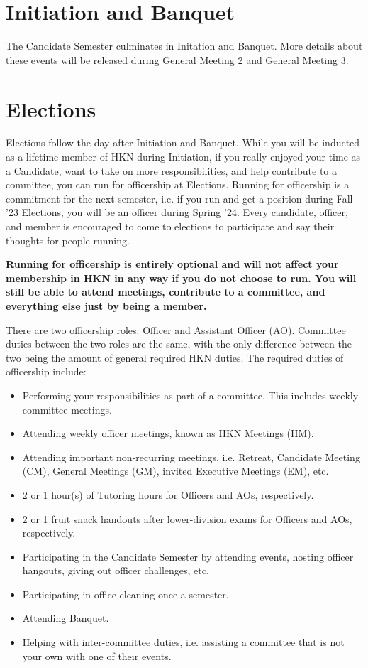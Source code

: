 \documentclass[11pt, article, oneside]{memoir}
\begin{document}
    \section{Initiation and Banquet}
        The Candidate Semester culminates in Initation and Banquet. More details about these events will be released during General Meeting 2 and General Meeting 3.


    \section{Elections}
        Elections follow the day after Initiation and Banquet. While you will be inducted as a lifetime member of HKN during Initiation, if you really enjoyed your time as a Candidate, want to take on more responsibilities, and help contribute to a committee, you can run for officership at Elections. Running for officership is a commitment for the next semester, i.e. if you run and get a position during Fall '23 Elections, you will be an officer during Spring '24. Every candidate, officer, and member is encouraged to come to elections to participate and say their thoughts for people running.
        
        \bigbreak

        \textbf{Running for officership is entirely optional and will not affect your membership in HKN in any way if you do not choose to run. You will still be able to attend meetings, contribute to a committee, and everything else just by being a member.}

        \bigbreak

        There are two officership roles: Officer and Assistant Officer (AO). Committee duties between the two roles are the same, with the only difference between the two being the amount of general required HKN duties. The required duties of officership include:
        \begin{itemize}
            \item Performing your responsibilities as part of a committee. This includes weekly committee meetings.
            \item Attending weekly officer meetings, known as HKN Meetings (HM).
            \item Attending important non-recurring meetings, i.e. Retreat, Candidate Meeting (CM), General Meetings (GM), invited Executive Meetings (EM), etc.
            \item 2 or 1 hour(s) of Tutoring hours for Officers and AOs, respectively.
            \item 2 or 1 fruit snack handouts after lower-division exams for Officers and AOs, respectively.
            \item Participating in the Candidate Semester by attending events, hosting officer hangouts, giving out officer challenges, etc.
            \item Participating in office cleaning once a semester.
            \item Attending Banquet.
            \item Helping with inter-committee duties, i.e. assisting a committee that is not your own with one of their events.
        \end{itemize}
\end{document}
